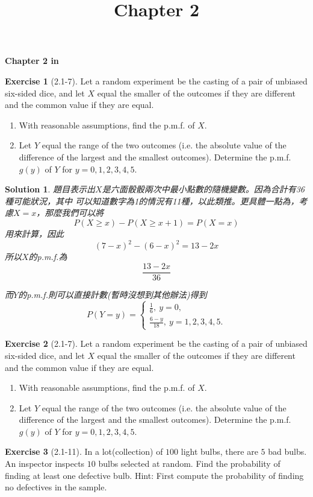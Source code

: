\documentclass[14pt]{article}
\newtheorem*{solution}{Solution}
\theoremstyle{definition}
\newtheorem*{exercise}{Exercise}
\theoremstyle{remark}
\numberwithin{equation}{section}
\numberwithin{theorem}{section}
\begin{document}
\setcounter{section}{0}
\title{Chapter 2}

\thispagestyle{empty}
\begin{center}
{\LARGE \bf Chapter 2 in \cite{Hog10}}
\end{center}

\begin{exercise}[2.1-7]
    Let a random experiment be the casting of a pair of unbiased six-sided dice, 
    and let $X$ equal the smaller of the outcomes if they are different and the common 
    value if they are equal.
    \begin{enumerate}
    \item With reasonable assumptions, find the p.m.f. of $X$.
    \item Let $Y$ equal the range of the two outcomes (i.e. the absolute value of the difference
     of the largest and the smallest outcomes). Determine the p.m.f. $g(y)$ of $Y$ for $y=0, 1, 2, 3, 4, 5$.
    \end{enumerate}
\end{exercise}

\begin{solution}
題目表示出$X$是六面骰骰兩次中最小點數的隨機變數。因為合計有36種可能狀況，其中
可以知道數字為1的情況有11種，以此類推。更具體一點為，考慮$X=x$，那麼我們可以將 
\[
P(X\geq x)-P(X\geq x+1)=P(X=x)
\]
用來計算，因此
\[
(7-x)^2-(6-x)^2=13-2x
\]
所以$X$的p.m.f.為
\[
\frac{13-2x}{36}
\]

而$Y$的p.m.f.則可以直接計數(暫時沒想到其他辦法)得到
\[P(Y=y)=\begin{cases}
\frac{1}{6},\ y=0,\\
\frac{6-y}{18},\ y=1,2,3,4,5.
\end{cases}\]

\end{solution}

\begin{exercise}[2.1-7]
    Let a random experiment be the casting of a pair of unbiased six-sided dice, 
    and let $X$ equal the smaller of the outcomes if they are different and the common 
    value if they are equal.
    \begin{enumerate}
    \item With reasonable assumptions, find the p.m.f. of $X$.
    \item Let $Y$ equal the range of the two outcomes (i.e. the absolute value of the difference
     of the largest and the smallest outcomes). Determine the p.m.f. $g(y)$ of $Y$ for $y=0, 1, 2, 3, 4, 5$.
    \end{enumerate}
\end{exercise}

\begin{exercise}[2.1-11]
    In a lot(collection) of $100$ light bulbs, there are $5$ bad bulbs. An inspector
    inspects $10$ bulbs selected at random. Find the probability of finding at least 
    one defective bulb. Hint: First compute the probability of finding no defectives in 
    the sample.
\end{exercise}

\newpage


\nocite{*}
\end{document}

